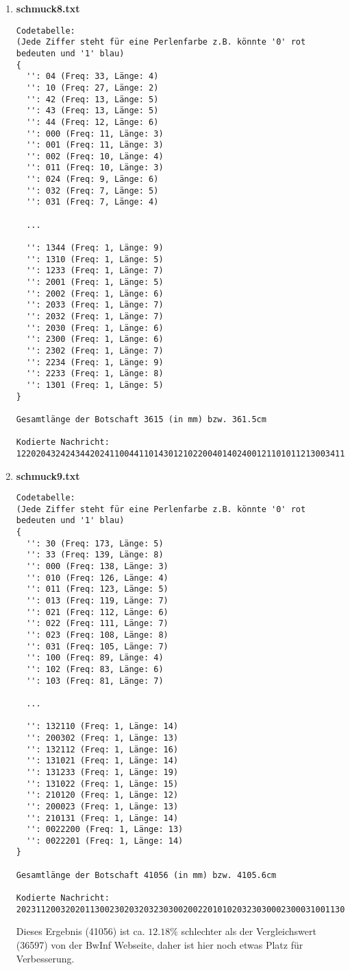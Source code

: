 \documentclass[a4paper,10pt,ngerman]{scrartcl}
\begin{document}
\begin{enumerate}
\begin{verbatim}
Gesamtlänge der Botschaft 153144 (in mm) bzw. 15314.4cm

Kodierte Nachricht: 0650371920810682302410347262610280210720434106823501509413620341063235844...
\end{verbatim}
  \item \textbf{schmuck8.txt}
\begin{verbatim}
Codetabelle:
(Jede Ziffer steht für eine Perlenfarbe z.B. könnte '0' rot bedeuten und '1' blau)
{
  '': 04 (Freq: 33, Länge: 4)
  '': 10 (Freq: 27, Länge: 2)
  '': 42 (Freq: 13, Länge: 5)
  '': 43 (Freq: 13, Länge: 5)
  '': 44 (Freq: 12, Länge: 6)
  '': 000 (Freq: 11, Länge: 3)
  '': 001 (Freq: 11, Länge: 3)
  '': 002 (Freq: 10, Länge: 4)
  '': 011 (Freq: 10, Länge: 3)
  '': 024 (Freq: 9, Länge: 6)
  '': 032 (Freq: 7, Länge: 5)
  '': 031 (Freq: 7, Länge: 4)

  ...

  '': 1344 (Freq: 1, Länge: 9)
  '': 1310 (Freq: 1, Länge: 5)
  '': 1233 (Freq: 1, Länge: 7)
  '': 2001 (Freq: 1, Länge: 5)
  '': 2002 (Freq: 1, Länge: 6)
  '': 2033 (Freq: 1, Länge: 7)
  '': 2032 (Freq: 1, Länge: 7)
  '': 2030 (Freq: 1, Länge: 6)
  '': 2300 (Freq: 1, Länge: 6)
  '': 2302 (Freq: 1, Länge: 7)
  '': 2234 (Freq: 1, Länge: 9)
  '': 2233 (Freq: 1, Länge: 8)
  '': 1301 (Freq: 1, Länge: 5)
}

Gesamtlänge der Botschaft 3615 (in mm) bzw. 361.5cm

Kodierte Nachricht: 122020432424344202411004411014301210220040140240012110101121300341141334412...

\end{verbatim}
  \item \textbf{schmuck9.txt}
\begin{verbatim}
Codetabelle:
(Jede Ziffer steht für eine Perlenfarbe z.B. könnte '0' rot bedeuten und '1' blau)
{
  '': 30 (Freq: 173, Länge: 5)
  '': 33 (Freq: 139, Länge: 8)
  '': 000 (Freq: 138, Länge: 3)
  '': 010 (Freq: 126, Länge: 4)
  '': 011 (Freq: 123, Länge: 5)
  '': 013 (Freq: 119, Länge: 7)
  '': 021 (Freq: 112, Länge: 6)
  '': 022 (Freq: 111, Länge: 7)
  '': 023 (Freq: 108, Länge: 8)
  '': 031 (Freq: 105, Länge: 7)
  '': 100 (Freq: 89, Länge: 4)
  '': 102 (Freq: 83, Länge: 6)
  '': 103 (Freq: 81, Länge: 7)

  ...

  '': 132110 (Freq: 1, Länge: 14)
  '': 200302 (Freq: 1, Länge: 13)
  '': 132112 (Freq: 1, Länge: 16)
  '': 131021 (Freq: 1, Länge: 14)
  '': 131233 (Freq: 1, Länge: 19)
  '': 131022 (Freq: 1, Länge: 15)
  '': 210120 (Freq: 1, Länge: 12)
  '': 200023 (Freq: 1, Länge: 13)
  '': 210131 (Freq: 1, Länge: 14)
  '': 0022200 (Freq: 1, Länge: 13)
  '': 0022201 (Freq: 1, Länge: 14)
}

Gesamtlänge der Botschaft 41056 (in mm) bzw. 4105.6cm

Kodierte Nachricht: 2023112003202011300230203203230300200220101020323030002300031001130231231112...
\end{verbatim}
Dieses Ergebnis (41056) ist ca. $12.18\%$ schlechter als der Vergleichswert (36597) von der BwInf Webseite, daher ist hier noch etwas Platz für Verbesserung.
\end{enumerate}
\end{document}

